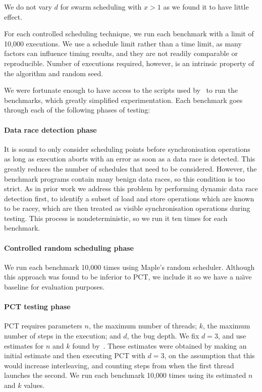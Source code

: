 We do not vary $d$ for swarm scheduling with $x > 1$ as we found it to have
little effect.

For each controlled scheduling technique, we run each benchmark with a limit of
10,000 executions.  We use a schedule limit rather than a time limit, as many
factors can influence timing results, and they are not readily comparable or
reproducible.  Number of executions required, however, is an intrinsic property
of the algorithm and random seed.

We were fortunate enough to have access to the scripts used
by~\cite{thomson2016,thomson2014} to run the benchmarks, which greatly
simplified experimentation.  Each benchmark goes through each of the
following phases of testing:

\paragraph{Data race detection phase}
It is sound to only consider scheduling points before synchronisation operations
as long as execution aborts with an error as soon as a data race is
detected\cite{musuvathi2008}.  This greatly reduces the number of schedules that
need to be considered.  However, the benchmark programs contain many benign data
races\cite{thomson2016}, so this condition is too strict.  As in prior
work\cite{thomson2016,thomson2014,yu2012} we address this problem by performing
dynamic data race detection first, to identify a subset of load and store
operations which are known to be racey, which are then treated as visible
synchronisation operations during testing.  This process is nondeterministic, so
we run it ten times for each benchmark.

\paragraph{Controlled random scheduling phase}
We run each benchmark 10,000 times using Maple's random scheduler.  Although
this approach was found to be inferior to PCT\cite{thomson2016}, we include it
so we have a na\"{\i}ve baseline for evaluation purposes.

\paragraph{PCT testing phase}
PCT requires parameters $n$, the maximum number of threads; $k$, the maximum
number of steps in the execution; and $d$, the bug depth.  We fix $d=3$, and use
estimates for $n$ and $k$ found by~\cite{thomson2016}.  These estimates were
obtained by making an initial estimate and then executing PCT with $d=3$, on the
assumption that this would increase interleaving, and counting steps from when
the first thread launches the second.  We run each benchmark 10,000 times using
its estimated $n$ and $k$ values.

